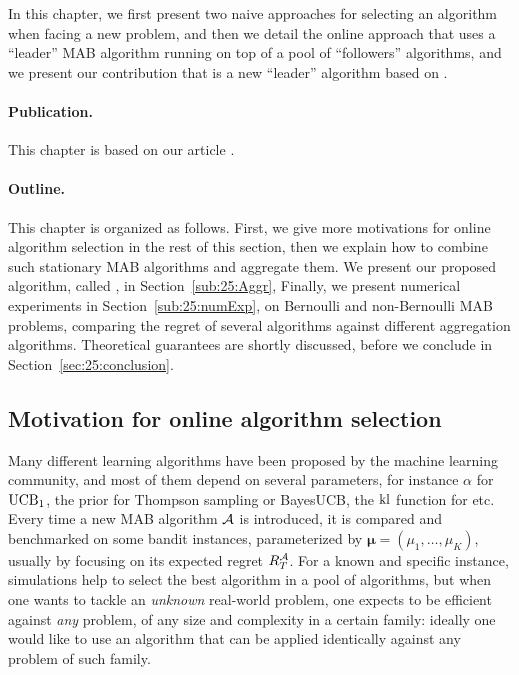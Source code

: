In this chapter, we first present two naive approaches for selecting an algorithm when facing a new problem, and then we detail the online approach that uses a ``leader'' MAB algorithm running on top of a pool of ``followers'' algorithms, and we present our contribution that is a new ``leader'' algorithm based on \ExpQ.


\paragraph{Publication.}
%
This chapter is based on our article \cite{Besson2018WCNC}.


\paragraph{Outline.}
This chapter is organized as follows.
First, we give more motivations for online algorithm selection in the rest of this section, then we explain how to combine such stationary MAB algorithms and aggregate them.
We present our proposed algorithm, called \Aggr, in Section~\ref{sub:25:Aggr},
Finally, we present numerical experiments in Section~\ref{sub:25:numExp},
on Bernoulli and non-Bernoulli MAB problems,
comparing the regret of several algorithms against different aggregation algorithms.
Theoretical guarantees are shortly discussed, before we conclude in Section~\ref{sec:25:conclusion}.


\subsection{Motivation for online algorithm selection}\label{sub:25:introduction}

Many different learning algorithms have been proposed by the machine learning community,
and most of them depend on several parameters, for instance $\alpha$ for $\mathrm{UCB}_1$, the prior for Thompson sampling or BayesUCB,
the $\mathrm{kl}$ function for \klUCB{} etc.
Every time a new MAB algorithm $\mathcal{A}$ is introduced, it is compared and benchmarked on some bandit instances, parameterized by $\boldsymbol{\mu} = (\mu_1,\dots,\mu_K)$, usually by focusing on its expected regret $R_T^{\mathcal{A}}$.
%
For a known and specific instance, simulations help to select the best algorithm in a pool of algorithms,
but when one wants to tackle an \emph{unknown} real-world problem, one expects to be efficient against \emph{any} problem, of any size and complexity in a certain family:
ideally one would like to use an algorithm that can be applied identically against any problem of such family.


